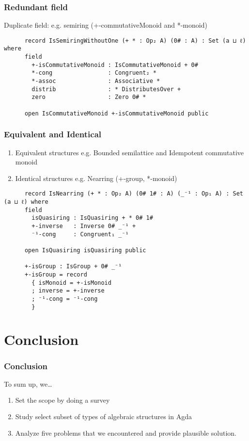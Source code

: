 \documentclass[xcolor={dvipsnames}]{beamer}
\begin{document}
\begin{frame}[fragile]
  \frametitle{Redundant field}

  Duplicate field: e.g. semiring (+-commutativeMonoid and *-monoid)

    \begin{verbatim}
      record IsSemiringWithoutOne (+ * : Op₂ A) (0# : A) : Set (a ⊔ ℓ) where
      field
        +-isCommutativeMonoid : IsCommutativeMonoid + 0#
        *-cong                : Congruent₂ *
        *-assoc               : Associative *
        distrib               : * DistributesOver +
        zero                  : Zero 0# *
      
      open IsCommutativeMonoid +-isCommutativeMonoid public
    \end{verbatim}
\end{frame}

\begin{frame}[fragile]
  \frametitle{Equivalent and Identical}
  \begin{enumerate} 
    \item Equivalent structures e.g. Bounded semilattice and Idempotent commutative monoid
    \item Identical structures e.g. Nearring (+-group, *-monoid)
  \end{enumerate}

    \begin{verbatim}
      record IsNearring (+ * : Op₂ A) (0# 1# : A) (_⁻¹ : Op₁ A) : Set (a ⊔ ℓ) where
      field
        isQuasiring : IsQuasiring + * 0# 1#
        +-inverse   : Inverse 0# _⁻¹ +
        ⁻¹-cong     : Congruent₁ _⁻¹
      
      open IsQuasiring isQuasiring public

      +-isGroup : IsGroup + 0# _⁻¹
      +-isGroup = record 
        { isMonoid = +-isMonoid 
        ; inverse = +-inverse 
        ; ⁻¹-cong = ⁻¹-cong 
        }
    \end{verbatim}
\end{frame}

\section{Conclusion}

\begin{frame}
  \frametitle{Conclusion}

  To sum up, we\ldots{}
  \begin{enumerate}
    \item Set the scope by doing a survey 
    \item Study select subset of types of algebraic structures in Agda
    \item Analyze five problems that we encountered and provide plausible
    solution.
  \end{enumerate}
\end{frame}
\end{document}
